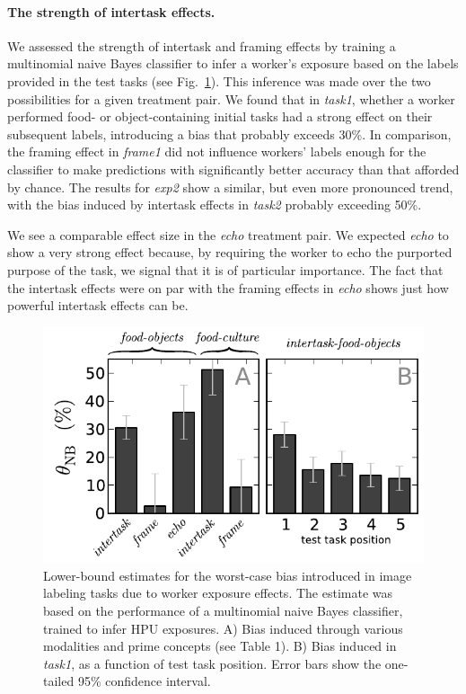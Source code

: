 \documentclass[12pt]{article}
\begin{document}
\paragraph{The strength of intertask effects.}

We assessed the strength of intertask and framing effects
by training a multinomial naive Bayes classifier to infer a worker's exposure
based on the labels provided in the test tasks (see Fig.~\ref{fig:theta}).
This inference was made over the two possibilities for a given treatment pair.
We found that in \textit{task1}, whether a worker performed food- or 
object-containing initial tasks had a strong effect on their subsequent 
labels, introducing a bias that probably exceeds 30\%.  In comparison, the 
framing effect in \textit{frame1} did 
not influence workers' labels enough for the classifier to make predictions 
with significantly better accuracy than that afforded by chance.  The results 
for \textit{exp2} show a similar, but even more pronounced trend, with the bias
induced by intertask effects in \textit{task2} probably exceeding 50\%.

We see a comparable effect size in the \textit{echo} treatment pair.
We expected \textit{echo} to show a very strong effect because, by requiring
the worker to echo the purported purpose of the task, we signal that it
is of particular importance.  The fact that the intertask effects were on par with the framing 
effects in \textit{echo} shows just how powerful intertask effects can be.

\begin{figure}
	\centering
	\includegraphics[scale=1]{figs/theta.pdf}
	\caption{
		Lower-bound estimates for the  worst-case bias introduced in image
		labeling tasks due to worker exposure effects.  The estimate was 
		based on the performance of a multinomial naive Bayes classifier,
		trained to infer HPU exposures. A) Bias induced through various
		modalities and prime concepts (see Table 1). B) Bias induced in 
		\textit{task1}, as a function of test task position.  Error bars
		show the one-tailed 95\% confidence interval.
	}
	\label{fig:theta}
\end{figure}
\end{document}
